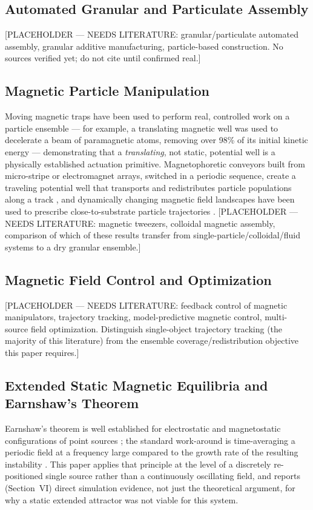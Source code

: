 \documentclass[journal]{IEEEtran}
\begin{document}
\subsection{Automated Granular and Particulate Assembly}
[PLACEHOLDER --- NEEDS LITERATURE: granular/particulate automated assembly,
granular additive manufacturing, particle-based construction. No sources
verified yet; do not cite until confirmed real.]

\subsection{Magnetic Particle Manipulation}
Moving magnetic traps have been used to perform real, controlled work on a
particle ensemble --- for example, a translating magnetic well was used to
decelerate a beam of paramagnetic atoms, removing over 98\% of its initial
kinetic energy \cite{moving_trap_decelerator} --- demonstrating that a
\emph{translating}, not static, potential well is a physically established
actuation primitive. Magnetophoretic conveyors built from micro-stripe or
electromagnet arrays, switched in a periodic sequence, create a traveling
potential well that transports and redistributes particle populations along
a track \cite{magnetophoretic_conveyor_patent}, and dynamically changing
magnetic field landscapes have been used to prescribe close-to-substrate
particle trajectories \cite{substrate_trajectories}. [PLACEHOLDER --- NEEDS
LITERATURE: magnetic tweezers, colloidal magnetic assembly, comparison of
which of these results transfer from single-particle/colloidal/fluid
systems to a dry granular ensemble.]

\subsection{Magnetic Field Control and Optimization}
[PLACEHOLDER --- NEEDS LITERATURE: feedback control of magnetic
manipulators, trajectory tracking, model-predictive magnetic control,
multi-source field optimization. Distinguish single-object trajectory
tracking (the majority of this literature) from the ensemble
coverage/redistribution objective this paper requires.]

\subsection{Extended Static Magnetic Equilibria and Earnshaw's Theorem}
Earnshaw's theorem is well established for electrostatic and magnetostatic
configurations of point sources \cite{earnshaw_wiki}; the standard
work-around is time-averaging a periodic field at a frequency large
compared to the growth rate of the resulting instability
\cite{earnshaw_timeaveraging_patent}. This paper applies that principle at
the level of a discretely re-positioned single source rather than a
continuously oscillating field, and reports (Section~VI) direct simulation
evidence, not just the theoretical argument, for why a static extended
attractor was not viable for this system.
\end{document}
